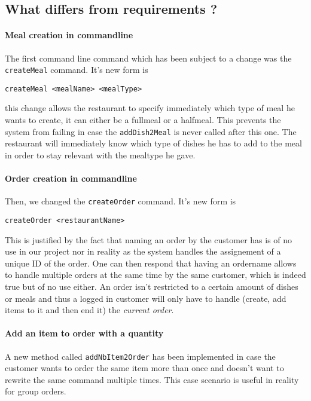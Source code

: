 \subsection{What differs from requirements ?} %
\label{sub:what_differs_from_requirements}

\paragraph{Meal creation in commandline} %
\label{par:meal_creation_in_commandline}
The first command line command which has been subject to a change
was the \lstinline|createMeal| command. It's new form is
\begin{center}
  \lstinline|createMeal <mealName> <mealType>|
\end{center}
this change allows the restaurant to specify immediately which type of meal
he wants to create, it can either be a fullmeal or a halfmeal.
This prevents the system from failing in case the \lstinline|addDish2Meal|
is never called after this one.
The restaurant will immediately know which type of dishes he has to add
to the meal in order to stay relevant with the mealtype he gave. 

\paragraph{Order creation in commandline} %
\label{par:order_creation_in_commandline}
Then, we changed the \lstinline|createOrder| command. It's new form is
\begin{center}
  \lstinline|createOrder <restaurantName>|
\end{center}
This is justified by the fact that naming an order by the customer
has is of no use in our project nor in reality as the system
handles the assignement of a unique ID of the order.
One can then respond that having an ordername allows to handle
multiple orders at the same time by the same customer,
which is indeed true but of no use either.
An order isn't restricted to a certain amount of dishes
or meals and thus a logged in customer will only
have to handle (create, add items to it and then end it)
the \emph{current order}.

\paragraph{Add an item to order with a quantity} %
\label{par:add_an_item_to_order_with_a_quantity}
A new method called \lstinline|addNbItem2Order| has been implemented
in case the customer wants to order the same item more than once
and doesn't want to rewrite the same command multiple times.
This case scenario is useful in reality for group orders.

